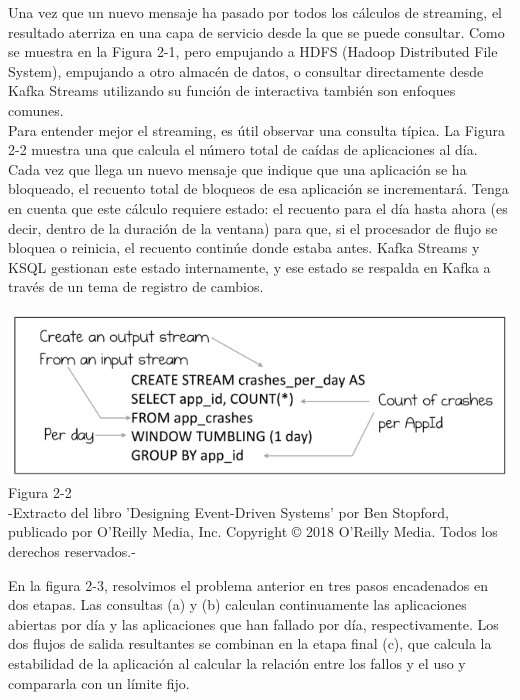 \documentclass{article}
\begin{document}
Una vez que un nuevo mensaje ha pasado por todos los cálculos de streaming, el resultado
aterriza en una capa de servicio desde la que se puede consultar. Como se muestra en la
Figura 2-1, pero empujando a HDFS (Hadoop Distributed File System), empujando a
otro almacén de datos, o consultar directamente desde Kafka Streams utilizando su función de
interactiva también son enfoques comunes.\\

Para entender mejor el streaming, es útil observar una consulta típica. La Figura 2-2
muestra una que calcula el número total de caídas de aplicaciones al día. Cada vez que llega un
nuevo mensaje que indique que una aplicación se ha bloqueado, el recuento total de bloqueos de esa aplicación se incrementará. Tenga en cuenta que este cálculo
requiere estado: el recuento para el día hasta ahora (es decir, dentro de la duración de la ventana)
para que, si el procesador de flujo se bloquea o reinicia, el recuento continúe donde estaba antes. Kafka Streams y KSQL gestionan este estado internamente, y ese estado se respalda en Kafka a través de un tema de registro de cambios.
\begin{center}
    \includegraphics[scale=0.8]{figure2.2.png}
    Figura 2-2\\
    -Extracto del libro 'Designing Event-Driven Systems' por Ben Stopford, publicado por O'Reilly Media, Inc. Copyright © 2018 O'Reilly Media. Todos los derechos reservados.-
\end{center}
En la figura 2-3, resolvimos el problema anterior en tres pasos encadenados en dos etapas. Las consultas (a) y (b) calculan continuamente las aplicaciones abiertas por día y las aplicaciones que han fallado por día, respectivamente. Los dos flujos de salida resultantes se combinan en la etapa final (c), que calcula la estabilidad de la aplicación al calcular la relación entre los fallos y el uso y compararla con un límite fijo.\\
\end{document}
